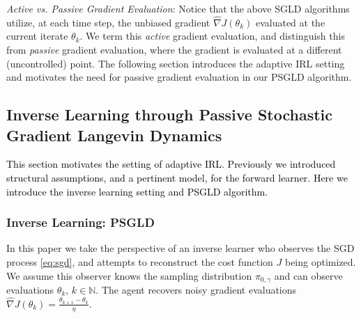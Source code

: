 \documentclass[journal,onecolumn]{IEEEtran}
\newcommand{\thk}{\theta_k}
\newcommand{\thkk}{\theta_{k+1}}
\newcommand{\gradn}{\hat{\nabla}}
\newcommand{\rew}{J}
\newcommand{\N}{\mathbb{N}}
\newcommand{\sgdstep}{\eta}
\newcommand{\ids}{\pi}
\newcommand{\idw}{\gamma}
\newcommand{\isp}{0,\idw}
\newcommand{\idistrw}{\ids_{\isp}}
\begin{document}
\textit{Active vs. Passive Gradient Evaluation}: Notice that the above SGLD algorithms utilize, at each time step, the unbiased gradient $\gradn\rew(\thk)$ evaluated at the current iterate $\thk$. We term this \textit{active} gradient evaluation, and distinguish this from \textit{passive} gradient evaluation, where the gradient is evaluated at a different (uncontrolled) point. The following section introduces the adaptive IRL setting and motivates the need for passive gradient evaluation in our PSGLD algorithm.



\subsection{Inverse Learning through Passive Stochastic Gradient Langevin Dynamics}
\label{subsec:IRLintro}
\textcolor{black}{This section motivates the setting of adaptive IRL. Previously we introduced structural assumptions, and a pertinent model, for the forward learner. Here we introduce the inverse learning setting and PSGLD algorithm.}

\subsubsection{Inverse Learning: PSGLD}
In this paper we take the perspective of an inverse learner who observes the SGD process \eqref{eq:sgd}, and attempts to reconstruct the cost function $\rew$ being optimized.
We assume this observer knows the sampling distribution $\idistrw$ and can observe evaluations $\thk, \,k \in \N$. The agent recovers noisy gradient evaluations $\gradn \rew(\thk) = \frac{\thkk - \thk}{\sgdstep}$.
\end{document}
